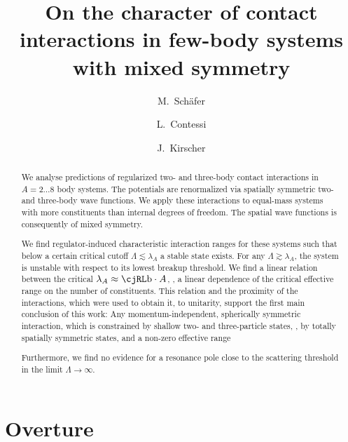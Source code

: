 \documentclass[aps,prd,onecolumn
,tightenlines,letterpaper,
notitlepage,11pt,
nofootinbib]{revtex4-1}
\begin{document}
\newenvironment{definition}[1][Definition]{\begin{trivlist}
\item[\hskip \labelsep {\textrm{\bfseries#1}}]}{\end{trivlist}}

 \author{M.~Sch\"afer}
 \author{L.~Contessi}
 \author{J.~Kirscher}


\title{
On the character of contact interactions in few-body systems with mixed symmetry
}
\begin{abstract}
We analyse predictions of regularized two- and three-body contact interactions
in $A=2\ldots8$ body systems. The potentials are renormalized via 
spatially symmetric two- and three-body wave functions.
We apply these interactions to equal-mass systems with more constituents than
internal degrees of freedom. The spatial wave functions is consequently
of mixed symmetry.

We find regulator-induced characteristic interaction ranges for these systems
such that below a certain critical cutoff $\Lambda\lesssim\lambda_A$ a stable state exists.
For any $\Lambda\gtrsim\lambda_A$, the system is unstable
with respect to its lowest breakup threshold.
We find a linear relation between the critical  $\lambda_A\approx\b\cdot A$, \ie, a linear dependence of the critical
effective range on the number of constituents. This relation and the proximity of the interactions, which were used to obtain it, to unitarity,
support the first main conclusion of this work: Any momentum-independent, spherically symmetric interaction, which is
constrained by shallow two- and three-particle states, \ie, by totally spatially symmetric states, and a non-zero effective range


 Furthermore, we find no evidence for a resonance pole close to the scattering
threshold in the limit $\Lambda\to\infty$.

\end{abstract}


\maketitle

\section{Overture}
\end{document}
